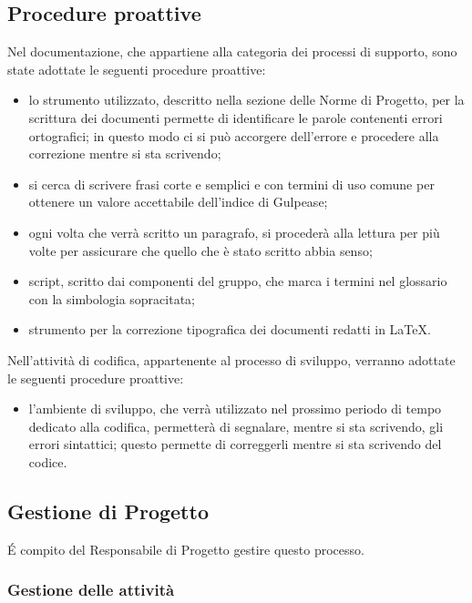 \subsection{Procedure proattive}
Nel  documentazione, che appartiene alla categoria dei processi di supporto, sono state adottate le seguenti procedure proattive:
\begin{itemize}
\item {} lo strumento utilizzato, descritto nella sezione delle Norme di Progetto, per la scrittura dei documenti permette di identificare le parole contenenti errori ortografici; in questo modo ci si può accorgere dell'errore e procedere alla correzione mentre si sta scrivendo;
\item {} si cerca di scrivere frasi corte e semplici e con termini di uso comune per ottenere un valore accettabile dell'indice di Gulpease;
\item {} ogni volta che verrà scritto un paragrafo, si procederà alla lettura per più volte per assicurare che quello che è stato scritto abbia senso;
\item {} script, scritto dai componenti del gruppo, che marca i termini nel glossario con la simbologia sopracitata;
\item {} strumento per la correzione tipografica dei documenti redatti in \LaTeX .
\end{itemize}
Nell'attività di codifica, appartenente al processo di sviluppo, verranno adottate le seguenti procedure proattive:
\begin{itemize}
\item {} l'ambiente di sviluppo, che verrà utilizzato nel prossimo periodo di tempo dedicato alla codifica, permetterà di segnalare, mentre si sta scrivendo, gli errori sintattici; questo permette di correggerli mentre si sta scrivendo del codice.
\end{itemize}

\subsection{Gestione di Progetto}
\'E compito del Responsabile di Progetto gestire questo processo.
\label{}

\subsubsection{Gestione delle attività}
\label{}

